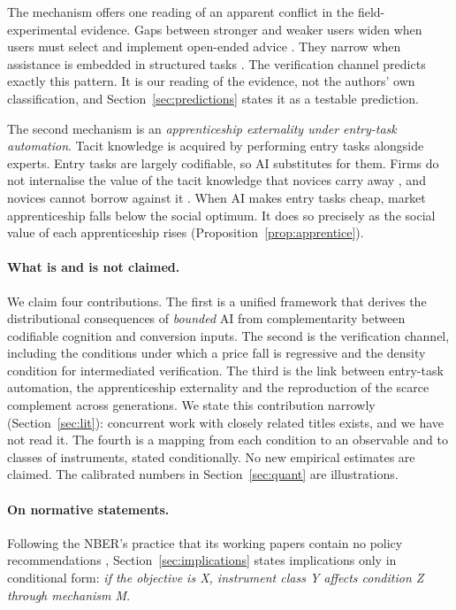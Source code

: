 \documentclass[12pt]{article}
\theoremstyle{remark}
\begin{document}
The mechanism offers one reading of an apparent conflict in the field-experimental evidence. Gaps between stronger and weaker users widen when users must select and implement open-ended advice \citep{otis2026uneven}. They narrow when assistance is embedded in structured tasks \citep{brynjolfsson2025work,cruces2026narrow}. The verification channel predicts exactly this pattern. It is our reading of the evidence, not the authors' own classification, and Section~\ref{sec:predictions} states it as a testable prediction.

The second mechanism is an \emph{apprenticeship externality under entry-task automation}. Tacit knowledge is acquired by performing entry tasks alongside experts. Entry tasks are largely codifiable, so AI substitutes for them. Firms do not internalise the value of the tacit knowledge that novices carry away \citep{becker1962investment}, and novices cannot borrow against it \citep{ide2025automation}. When AI makes entry tasks cheap, market apprenticeship falls below the social optimum. It does so precisely as the social value of each apprenticeship rises (Proposition~\ref{prop:apprentice}).

\paragraph{What is and is not claimed.} We claim four contributions. The first is a unified framework that derives the distributional consequences of \emph{bounded} AI from complementarity between codifiable cognition and conversion inputs. The second is the verification channel, including the conditions under which a price fall is regressive and the density condition for intermediated verification. The third is the link between entry-task automation, the apprenticeship externality and the reproduction of the scarce complement across generations. We state this contribution narrowly (Section~\ref{sec:lit}): concurrent work with closely related titles exists, and we have not read it. The fourth is a mapping from each condition to an observable and to classes of instruments, stated conditionally. No new empirical estimates are claimed. The calibrated numbers in Section~\ref{sec:quant} are illustrations.

\paragraph{On normative statements.} Following the NBER's practice that its working papers contain no policy recommendations \citep[resolution reproduced in][front matter]{agrawal2026volume}, Section~\ref{sec:implications} states implications only in conditional form: \emph{if the objective is X, instrument class Y affects condition Z through mechanism M}.
\end{document}
